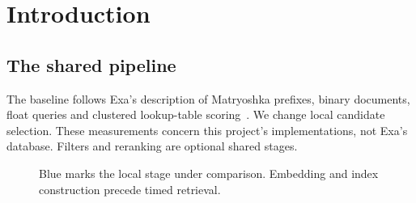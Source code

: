 \begin{abstract}
Clustered scanning, bitplane search and weighted bit-pattern lookup are compared under common
recall and memory limits. Formulas guide independent parameter choices. Scanning remained
fastest on real embeddings. In constructed cases, backward walk was about 10\% faster for
fixed important coordinates; bitplanes were about 152 times faster when they changed.
Revised predictions for six selected settings were within 10\% of separate-query measurements.
\end{abstract}

\section{Introduction}
\subsection{The shared pipeline}
The baseline follows Exa's description of Matryoshka prefixes, binary documents, float
queries and clustered lookup-table scoring~\cite{exa}. We change local candidate selection.
These measurements concern this project's implementations, not Exa's database. Filters and
reranking are optional shared stages.

\begin{figure}[H]\centering
{}
\caption{Blue marks the local stage under comparison. Embedding and index construction
precede timed retrieval.}
\end{figure}


